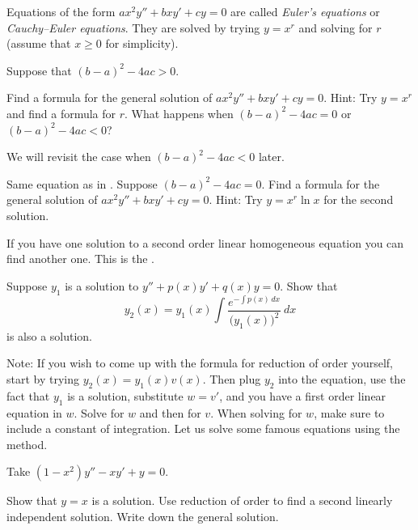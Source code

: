 Equations of the form $a x^2 y'' + b x y' + c y = 0$ are called
\emph{Euler's equations} or
\emph{Cauchy--Euler equations}.
They are solved by trying
$y=x^r$ and solving for $r$ (assume that $x \geq 0$ for simplicity).

\begin{exercise} \label{sol:eulerex}
Suppose that ${(b-a)}^2-4ac > 0$.
\begin{tasks}
\task Find a formula for the general solution
of $a x^2 y'' + b x y' + c y = 0$.  Hint: Try $y=x^r$ and find a formula for
$r$.
\task What happens when ${(b-a)}^2-4ac = 0$ or ${(b-a)}^2-4ac < 0$?
\end{tasks}
\end{exercise}

We will revisit the case when ${(b-a)}^2-4ac < 0$ later.

\begin{exercise} \label{sol:eulerexln}
Same equation as in .
Suppose ${(b-a)}^2-4ac = 0$.  Find a formula for the general solution
of $a x^2 y'' + b x y' + c y = 0$.  Hint: Try $y=x^r \ln x$ for the second
solution.
\end{exercise}

If you have one solution to a second order linear homogeneous
equation you can find another one.  This is the \emph{}.

\begin{exercise} \label{exercise:reductionoforder}
Suppose $y_1$ is a solution to $y'' + p(x) y' + q(x) y = 0$.
Show that
\begin{equation*}
y_2(x) = y_1(x) \int \frac{e^{-\int p(x)\,dx}}{{\bigl(y_1(x)\bigr)}^2} ~dx
\end{equation*}
is also a solution.
\end{exercise}

Note: If you wish to come up with the formula for reduction of order
yourself,
start by trying $y_2(x) = y_1(x) v(x)$.  Then plug $y_2$ into the
equation, use the fact that $y_1$ is a solution, substitute
$w = v'$, and you have a first order linear equation in $w$.  Solve for
$w$ and then for $v$.  When solving for $w$, make sure to include a constant
of integration.
Let us solve some famous equations using the method.

\begin{exercise}
Take 
$(1-x^2)y''-xy' + y = 0$.
\begin{tasks}
\task Show that $y=x$ is a solution.
\task Use reduction of order to find a second linearly independent solution.
\task Write down the general solution.
\end{tasks}
\end{exercise}

